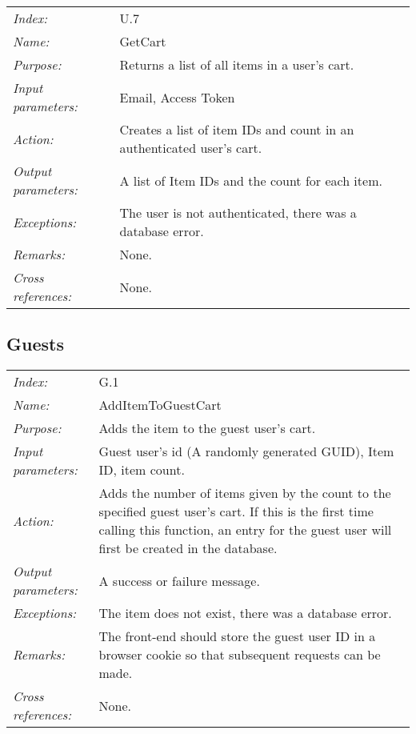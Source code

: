 \documentclass[10pt,letter]{article}
\begin{document}
\begin{tabularx}{\textwidth}{l X}
    \it{Index:} & U.7 \\
    \it{Name:} & GetCart \\
    \it{Purpose:} & Returns a list of all items in a user's cart. \\
    \it{Input parameters:} & Email, Access Token \\
    \it{Action:} & Creates a list of item IDs and count in an authenticated user's cart. \\
    \it{Output parameters:} & A list of Item IDs and the count for each item. \\
    \it{Exceptions:} & The user is not authenticated, there was a database error. \\
    \it{Remarks:} & None. \\
    \it{Cross references:} & None. \\
    \hline
\end{tabularx}

\subsection{Guests}

\begin{tabularx}{\textwidth}{l X}
    \it{Index:} & G.1 \\
    \it{Name:} & AddItemToGuestCart \\
    \it{Purpose:} & Adds the item to the guest user's cart. \\
    \it{Input parameters:} & Guest user's id (A randomly generated GUID), Item ID, item count. \\
    \it{Action:} & Adds the number of items given by the count to the specified guest user's cart. If this is the first time calling this function, 
    an entry for the guest user will first be created in the database.\\
    \it{Output parameters:} & A success or failure message. \\
    \it{Exceptions:} & The item does not exist, there was a database error. \\
    \it{Remarks:} & The front-end should store the guest user ID in a browser cookie so that subsequent requests can be made. \\
    \it{Cross references:} & None. \\
    \hline
\end{tabularx}
\end{document}
